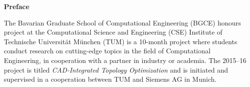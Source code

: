 \clearemptydoublepage
{}
{}	


\vspace*{3cm}

\begin{flushleft}
{\Large \bf Preface}
\end{flushleft}

\vspace{1cm}
The Bavarian Graduate School of Computational Engineering (BGCE) honours project at the Computational Science and Engineering (CSE) Institute of Technische Universit{\"a}t M{\"u}nchen (TUM) is a 10-month project where students conduct research on cutting-edge topics in the field of Computational Engineering, in cooperation with a partner in industry or academia. The 2015--16 project is titled \emph{CAD-Integrated Topology Optimization} and is initiated and supervised in a cooperation between TUM and Siemens AG in Munich.


\newpage
